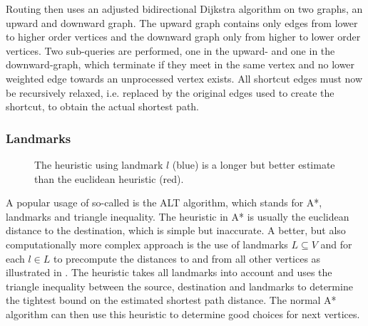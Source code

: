 			Routing then uses an adjusted bidirectional Dijkstra algorithm\cite[29-30]{geisberger-contraction-hierarchies} on two graphs, an upward and downward graph.
			The upward graph contains only edges from lower to higher order vertices and the downward graph only from higher to lower order vertices.
			Two sub-queries are performed, one in the upward- and one in the downward-graph, which terminate if they meet in the same vertex and no lower weighted edge towards an unprocessed vertex exists.
			All shortcut edges must now be recursively relaxed, i.e. replaced by the original edges used to create the shortcut, to obtain the actual shortest path.
		
		\subsubsection{Landmarks}
		\label{subsubsec:landmarks}
			
			\begin{figure}
				\vspace{-3\baselineskip}
				\begin{figcenter}
				\end{figcenter}
				\caption{The heuristic using landmark $l$ (blue) is a longer but better estimate than the euclidean heuristic (red).}
				\label{fig:landmarks}
			\end{figure}
			
			A popular usage of so-called  is the ALT algorithm, which stands for A*, landmarks and triangle inequality\cite{goldberg-landmarks}.
			The heuristic in A* is usually the euclidean distance to the destination, which is simple but inaccurate.
			A better, but also computationally more complex approach is the use of landmarks $L \subseteq V$ and for each $l \in L$ to precompute the distances to and from all other vertices as illustrated in .
			The heuristic takes all landmarks into account and uses the triangle inequality between the source, destination and landmarks to determine the tightest bound on the estimated shortest path distance.
			The normal A* algorithm can then use this heuristic to determine good choices for next vertices.
		
